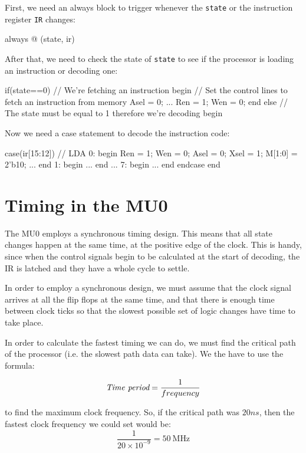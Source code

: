 \documentclass{article}
\begin{document}
First, we need an always block to trigger whenever the {\tt state} or the
instruction register {\tt IR} changes:

\begin{listing}{1}
always @ (state, ir)
\end{listing}

After that, we need to check the state of {\tt state} to see if the processor is
loading an instruction or decoding one:

\begin{listingcont}
	if(state==0)	// We're fetching an instruction
		begin
		// Set the control lines to fetch an instruction from memory
		Asel = 0;
		...
		Ren = 1;
		Wen = 0;
		end
	else 		// The state must be equal to 1 therefore we're decoding
		begin
\end{listingcont}

Now we need a case statement to decode the instruction code:

\begin{listingcont}
	case(ir[15:12])
		// LDA
		0: 	begin
			Ren = 1;
			Wen = 0;
			Asel = 0;
			Xsel = 1;
			M[1:0] = 2'b10;
			...
			end
		1:	begin
			...
			end
		...
		7:	begin
			...
			end
	endcase
end
\end{listingcont}

\section{Timing in the MU0}

The MU0 employs a synchronous timing design. This means that all state changes
happen at the same time, at the positive edge of the clock. This is handy, since
when the control signals begin to be calculated at the start of decoding, the IR
is latched and they have a whole cycle to settle.

In order to employ a synchronous design, we must assume that the clock signal
arrives at all the flip flops at the same time, and that there is enough time
between clock ticks so that the slowest possible set of logic changes have time
to take place.

In order to calculate the fastest timing we can do, we must find the critical path of the processor (i.e. the slowest path data can take). We the have to use the formula:

\[
	\textrm{\it Time period} = \frac{1}{frequency}
\]

to find the maximum clock frequency. So, if the critical path was $20ns$, then
the fastest clock frequency we could set would be:
\[
	\frac{1}{20\times10^{-9}} = \SI{50}{\mega\hertz}
\]
\end{document}
